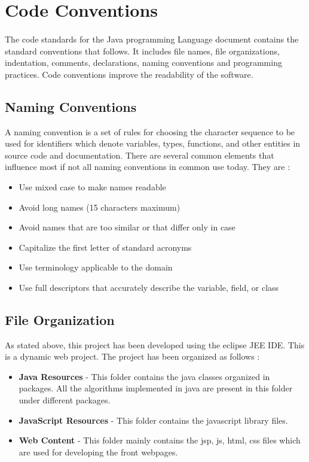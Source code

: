 \documentclass[12pt,a4paper]{report}
\begin{document}
\section{Code Conventions}
\paragraph{}The code standards for the Java programming Language document contains the standard conventions that follows. It includes file names, file organizations, indentation, comments, declarations, naming conventions and programming practices. Code conventions improve the readability of the software.
\subsection{Naming Conventions}
 A naming convention is a set of rules for choosing the character sequence to be used for identifiers which denote variables, types, functions, and other entities in source code and documentation.  There are several common elements that influence most if not all naming conventions in common use today. They are :
\begin{itemize}
\item Use mixed case to make names readable
\item Avoid long names (15 characters maximum)
\item Avoid names that are too similar or that differ only in case
\item Capitalize the first letter of standard acronyms
\item Use terminology applicable to the domain
\item Use full descriptors that accurately describe the variable, field, or class
\end{itemize}
\subsection{File Organization}
As stated above, this project has been developed using the eclipse JEE IDE. This is a dynamic web project. The project has been organized as follows :
\begin{itemize}
\item\textbf{Java Resources} - This folder contains the java classes organized in packages. All the algorithms implemented in java are present in this folder under different packages.
\item\textbf{JavaScript Resources} - This folder contains the javascript library files.
\item\textbf{Web Content} - This folder mainly contains the jsp, js, html, css files which are used for developing the front webpages.
\end{itemize}
\end{document}
